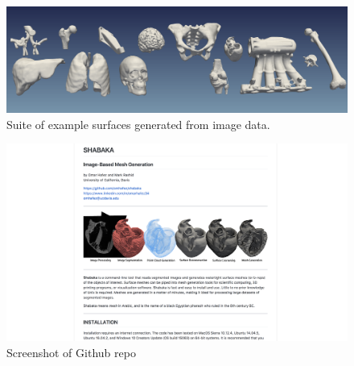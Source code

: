 \begin{figure}[ht!]
\centering
\vspace{2.5mm}
\includegraphics[width=1.0\textwidth]{media/2-shabaka/2-surf/6-showcase.png}
\caption{Suite of example surfaces generated from image data.}
\label{fig:showcase}
\end{figure}

\begin{figure}[ht!]
\centering
\vspace{2.5mm}
\includegraphics[width=1.0\textwidth]{media/2-shabaka/2-surf/7-shabaka.png}
\caption{Screenshot of Github repo}
\label{fig:github}
\end{figure}

